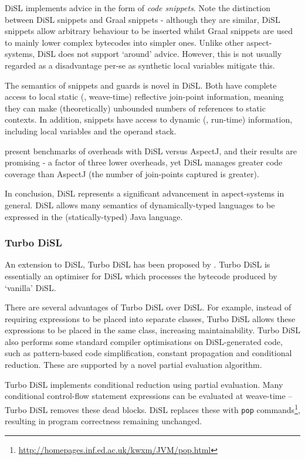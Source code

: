 		DiSL implements advice in the form of \textit{code snippets}. Note the distinction between DiSL snippets and Graal snippets - although they are similar, DiSL snippets allow arbitrary behaviour to be inserted whilst Graal snippets are used to mainly lower complex bytecodes into simpler ones. Unlike other aspect-systems, DiSL does not support `around' advice. However, this is not usually regarded as a disadvantage per-se as synthetic local variables mitigate this.
		
		The semantics of snippets and guards is novel in DiSL. Both have complete access to local static (\ie, weave-time) reflective join-point information, meaning they can make (theoretically) unbounded numbers of references to static contexts. In addition, snippets have access to dynamic (\ie, run-time) information, including local variables and the operand stack.
		
		\citeauthor{Marek2012} present benchmarks of overheads with DiSL versus AspectJ, and their results are promising - a factor of three lower overheads, yet DiSL manages greater code coverage than AspectJ (the number of join-points captured is greater).
		
		In conclusion, DiSL represents a significant advancement in aspect-systems in general. DiSL allows many semantics of dynamically-typed languages to be expressed in the (statically-typed) Java language.
	
		\subsubsection{Turbo DiSL} \label{sec:instrumentation/hybrid/disl/turbo}
		An extension to DiSL, Turbo DiSL has been proposed by \citet[p.~353-368]{Furia2012}. Turbo DiSL is essentially an optimiser for DiSL which processes the bytecode produced by `vanilla' DiSL.
		
		There are several advantages of Turbo DiSL over DiSL. For example, instead of requiring expressions to be placed into separate classes, Turbo DiSL allows these expressions to be placed in the same class, increasing maintainability. Turbo DiSL also performs some standard compiler optimisations on DiSL-generated code, such as pattern-based code simplification, constant propagation and conditional reduction. These are supported by a novel partial evaluation algorithm.
		
		Turbo DiSL implements conditional reduction using partial evaluation. Many conditional control-flow statement expressions can be evaluated at weave-time -- Turbo DiSL removes these dead blocks. DiSL replaces these with \texttt{pop} commands\footnote{\url{http://homepages.inf.ed.ac.uk/kwxm/JVM/pop.html}}, resulting in program correctness remaining unchanged.
		
